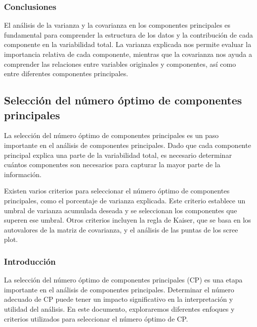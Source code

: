 \documentclass{article}
\begin{document}
\subsubsection*{Conclusiones}
El análisis de la varianza y la covarianza en los componentes principales es fundamental para comprender la estructura de los datos y la contribución de cada componente en la variabilidad total. La varianza explicada nos permite evaluar la importancia relativa de cada componente, mientras que la covarianza nos ayuda a comprender las relaciones entre variables originales y componentes, así como entre diferentes componentes principales.


\subsection{Selección del número óptimo de componentes principales}
La selección del número óptimo de componentes principales es un paso importante en el análisis de componentes principales. Dado que cada componente principal explica una parte de la variabilidad total, es necesario determinar cuántos componentes son necesarios para capturar la mayor parte de la información.

Existen varios criterios para seleccionar el número óptimo de componentes principales, como el porcentaje de varianza explicada. Este criterio establece un umbral de varianza acumulada deseada y se seleccionan los componentes que superen ese umbral. Otros criterios incluyen la regla de Kaiser, que se basa en los autovalores de la matriz de covarianza, y el análisis de las puntas de los scree plot.


\subsubsection{Introducción}
La selección del número óptimo de componentes principales (CP) es una etapa importante en el análisis de componentes principales. Determinar el número adecuado de CP puede tener un impacto significativo en la interpretación y utilidad del análisis. En este documento, exploraremos diferentes enfoques y criterios utilizados para seleccionar el número óptimo de CP.

\end{document}
